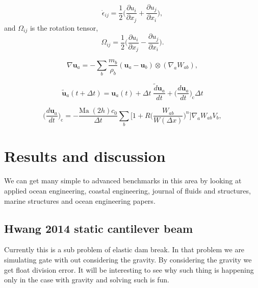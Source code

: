 \documentclass[preprint,12pt]{elsarticle}
\newcommand{\ten}[1]{\ensuremath{\mathbf{#1}}}
\begin{document}
\begin{equation}
  \label{eq:strain-tensor}
  \dot{\epsilon}_{ij} = \frac{1}{2} \bigg(\frac{\partial u_i}{\partial x_j} +
  \frac{\partial u_j}{\partial x_i} \bigg),
\end{equation}
and $\Omega_{ij}$ is the rotation tensor,
\begin{equation}
  \label{eq:rotational-tensor}
  \Omega_{ij} = \frac{1}{2} \bigg(\frac{\partial u_i}{\partial x_j} -
  \frac{\partial u_j}{\partial x_i} \bigg).
\end{equation}


\begin{equation}
  \label{eq:sph-vel-grad}
  \nabla \ten{u}_a =
  - \sum_{b} \frac{m_b}{\rho_{b}} (\ten{u}_{a} - \ten{u}_{b}) \otimes (\nabla_{a} W_{ab}),
\end{equation}


\begin{equation}
  \label{eq:transport_velocity}
  \ten{\tilde{u}}_a(t + \Delta t) =\ten{u}_a(t) + \Delta t \; \frac{\tilde{d} \ten{u}_a}{dt} +
  \bigg(\frac{d \ten{u}_{a}}{dt}\bigg)_{\text{c}} \Delta t
\end{equation}


\begin{equation}
  \label{eq:sun2019_pst}
  \bigg(\frac{d \ten{u}_a}{dt}\bigg)_{\text{c}} = - \frac{\text{Ma} \;
    (2h) c_0}{\Delta t} \sum_b \bigg[1 + R \bigg( \frac{W_{ab}}{W(\Delta x)} \bigg)^n
  \bigg] \nabla_a W_{ab} V_b,
\end{equation}


\section{Results and discussion}
\label{sec:results}

We can get many simple to advanced benchmarks in this area by looking at
applied ocean engineering, coastal engineering, journal of fluids and
structures, marine structures and ocean engineering papers.


\subsection{Hwang 2014 static cantilever beam}
\label{sec:hwang-2014-static-cantilever-beam}
Currently this is a sub problem of elastic dam break. In that problem we are
simulating gate with out considering the gravity. By considering the gravity
we get float division error. It will be interesting to see why such thing is
happening only in the case with gravity and solving such is fun.
\end{document}
